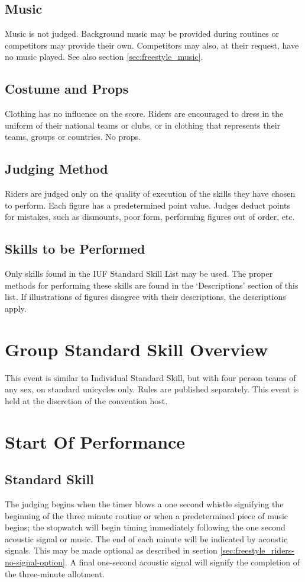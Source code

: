 \subsection{Music}
Music is not judged.
Background music may be provided during routines or competitors may provide their own.
Competitors may also, at their request, have no music played.
See also section \ref{sec:freestyle_music}.

\subsection{Costume and Props}
Clothing has no influence on the score.
Riders are encouraged to dress in the uniform of their national teams or clubs, or in clothing that represents their teams, groups or countries.
No props.

\subsection{Judging Method}
Riders are judged only on the quality of execution of the skills they have chosen to perform.
Each figure has a predetermined point value.
Judges deduct points for mistakes, such as dismounts, poor form, performing figures out of order, etc.

\subsection{Skills to be Performed}
Only skills found in the IUF Standard Skill List may be used.
The proper methods for performing these skills are found in the `Descriptions' section of this list.
If illustrations of figures disagree with their descriptions, the descriptions apply.

\section{Group Standard Skill Overview}
This event is similar to Individual Standard Skill, but with four person teams of any sex, on standard unicycles only.
Rules are published separately.
This event is held at the discretion of the convention host.

\section{Start Of Performance}

\subsection{Standard Skill}
The judging begins when the timer blows a one second whistle signifying the beginning of the three minute routine or when a predetermined piece of music begins; the stopwatch will begin timing immediately following the one second acoustic signal or music.
The end of each minute will be indicated by acoustic signals.
This may be made optional as described in section \ref{sec:freestyle_riders-no-signal-option}.
A final one-second acoustic signal will signify the completion of the three-minute allotment.

